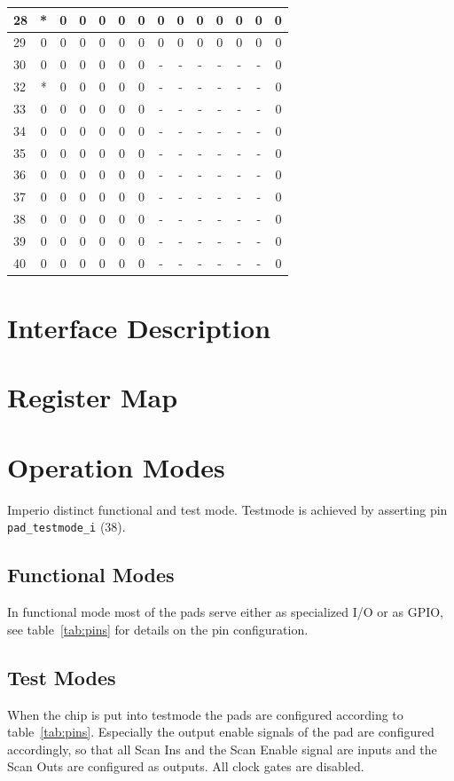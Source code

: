 \begin{table}[htbp]
\begin{tabularx}{\textwidth}{|X|c|c|c|c|c|c||c|c|c|c|c|c||c|}
   28 & * & 0 & 0 & 0 & 0 & 0 & 0 & 0 & 0 & 0 & 0 & 0 & 0 \\ \hline
   29 & 0 & 0 & 0 & 0 & 0 & 0 & 0 & 0 & 0 & 0 & 0 & 0 & 0 \\ \hline
   30 & 0 & 0 & 0 & 0 & 0 & 0 & - & - & - & - & - & - & 0 \\ \hline
   32 & * & 0 & 0 & 0 & 0 & 0 & - & - & - & - & - & - & 0 \\ \hline
   33 & 0 & 0 & 0 & 0 & 0 & 0 & - & - & - & - & - & - & 0 \\ \hline
   34 & 0 & 0 & 0 & 0 & 0 & 0 & - & - & - & - & - & - & 0 \\ \hline
   35 & 0 & 0 & 0 & 0 & 0 & 0 & - & - & - & - & - & - & 0 \\ \hline
   36 & 0 & 0 & 0 & 0 & 0 & 0 & - & - & - & - & - & - & 0 \\ \hline
   37 & 0 & 0 & 0 & 0 & 0 & 0 & - & - & - & - & - & - & 0 \\ \hline
   38 & 0 & 0 & 0 & 0 & 0 & 0 & - & - & - & - & - & - & 0 \\ \hline
   39 & 0 & 0 & 0 & 0 & 0 & 0 & - & - & - & - & - & - & 0 \\ \hline
   40 & 0 & 0 & 0 & 0 & 0 & 0 & - & - & - & - & - & - & 0 \\ \hline
\end{tabularx}  
\end{table}

\section{Interface Description}

\section{Register Map}

\section{Operation Modes}
Imperio distinct functional and test mode. Testmode is achieved by asserting pin \verb+pad_testmode_i+ (38).
\subsection{Functional Modes}
  In functional mode most of the pads serve either as specialized I/O or as GPIO, see table~\ref{tab:pins} for details on the pin configuration.

\subsection{Test Modes}
  When the chip is put into testmode the pads are configured according to table~\ref{tab:pins}. Especially the output enable signals of the pad are configured accordingly, so that all Scan Ins and the Scan Enable signal are inputs and the Scan Outs are configured as outputs. All clock gates are disabled. 


